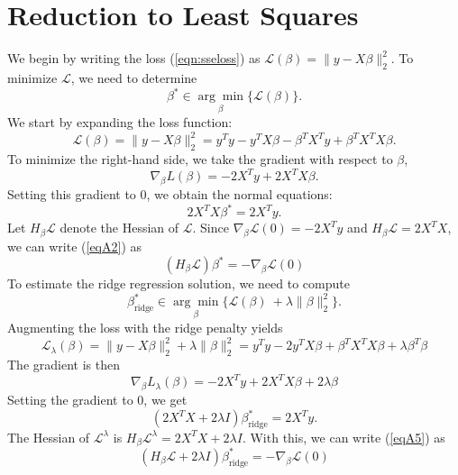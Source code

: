\documentclass[10pt]{article}
\begin{document}
\section{Reduction to Least Squares}
\label{app1}
We begin by writing the loss (\ref{eqn:sseloss}) as $\mathcal{L}(\beta) = \|y-X\beta\|^2_2$. To minimize $\mathcal{L}$, we need to determine
\begin{equation}
    \beta^* \in \underset{\beta}{\arg\min} \{\mathcal{L}(\beta)\}.
\end{equation}
We start by expanding the loss function: 
\begin{equation*}
    \mathcal{L}(\beta) = \|y-X\beta\|^2_2 = y^Ty -y^TX\beta - \beta^TX^Ty+\beta^TX^TX\beta.
\end{equation*}
To minimize the right-hand side, we take the gradient with respect to $\beta$,
\begin{equation*}
\nabla_{\beta} L(\beta) = -2X^T y + 2 X^T X \beta.
\end{equation*}
Setting this gradient to $0$, we obtain the normal equations:
\begin{equation}
    2 X^T X \beta^\ast = 2X^T y.
    \label{eqA2}
\end{equation}
Let $H_{\beta} \mathcal{L}$ denote the Hessian of $\mathcal{L}$.  Since $\nabla_{\beta} \mathcal{L}(0) = -2X^T y$ and  $H_{\beta}\mathcal{L}=  2X^T X $, we can write (\ref{eqA2}) as
\begin{equation}
    (H_{\beta}\mathcal{L}) \beta^\ast = -\nabla_{\beta} \mathcal{L}(0)
    \label{eqA3}
\end{equation}
To estimate the ridge regression solution, we need to compute
\begin{equation}
    \beta_{\text{ridge}}^* \in \underset{\beta}{\arg\min} \{\mathcal{L}(\beta)\ + \lambda \|\beta\|^2_2\}.
\end{equation}
Augmenting the loss with the ridge penalty yields
\begin{equation*}
 \mathcal{L}_{\lambda}(\beta) =  \|y-X\beta\|^2_2 + \lambda \| \beta\|_2^2 = y^Ty -2 y^TX\beta+\beta^TX^TX\beta + \lambda \beta^T \beta
\end{equation*}
The gradient is then
\begin{equation*}
\nabla_{\beta} L_{\lambda}(\beta) = -2 X^T y+ 2 X^T X \beta+2 \lambda \beta
\end{equation*}
Setting the gradient to $0$, we get
\begin{equation}
    (2 X^T X + 2\lambda I) \beta_{\text{ridge}}^\ast = 2X^T y.
    \label{eqA5}
\end{equation}
The Hessian of $\mathcal{L}^\lambda$ is $H_{\beta} \mathcal{L}^\lambda =  2X^T X + 2\lambda I $.  With this, we can write (\ref{eqA5}) as
\begin{equation}
    (H_{\beta}\mathcal{L} + 2\lambda I) \beta_{\text{ridge}}^\ast = - \nabla_{\beta} \mathcal{L}(0) 
\end{equation}
\end{document}
